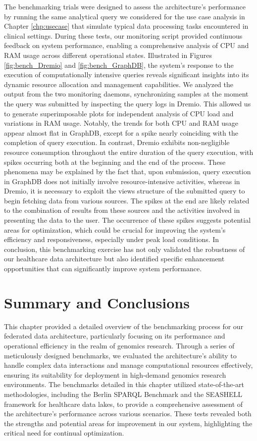The benchmarking trials were designed to assess the architecture's performance by running the same analytical query we considered for the use case analysis in Chapter \ref{chp:usecase} that simulate typical data processing tasks encountered in clinical settings. During these tests, our monitoring script provided continuous feedback on system performance, enabling a comprehensive analysis of \ac{CPU} and \ac{RAM} usage across different operational states.
Illustrated in Figures \ref{fig:bench_Dremio} and \ref{fig:bench_GraphDB}, the system's response to the execution of computationally intensive queries reveals significant insights into its dynamic resource allocation and management capabilities.
We analyzed the output from the two monitoring daemons, synchronizing samples at the moment the query was submitted by inspecting the query logs in Dremio. This allowed us to generate superimposable plots for independent analysis of \ac{CPU} load and variations in \ac{RAM} usage.
Notably, the trends for both \ac{CPU} and \ac{RAM} usage appear almost flat in GraphDB, except for a spike nearly coinciding with the completion of query execution. In contrast, Dremio exhibits non-negligible resource consumption throughout the entire duration of the query execution, with spikes occurring both at the beginning and the end of the process.
These phenomena may be explained by the fact that, upon submission, query execution in GraphDB does not initially involve resource-intensive activities, whereas in Dremio, it is necessary to exploit the views structure of the submitted query to begin fetching data from various sources. The spikes at the end are likely related to the combination of results from these sources and the activities involved in presenting the data to the user.
The occurrence of these spikes suggests potential areas for optimization, which could be crucial for improving the system's efficiency and responsiveness, especially under peak load conditions.
In conclusion, this benchmarking exercise has not only validated the robustness of our healthcare data architecture but also identified specific enhancement opportunities that can significantly improve system performance.


\section{Summary and Conclusions}
This chapter provided a detailed overview of the benchmarking process for our federated data architecture, particularly focusing on its performance and operational efficiency in the realm of genomics research. Through a series of meticulously designed benchmarks, we evaluated the architecture's ability to handle complex data interactions and manage computational resources effectively, ensuring its suitability for deployment in high-demand genomics research environments.
The benchmarks detailed in this chapter utilized state-of-the-art methodologies, including the Berlin \ac{SPARQL} Benchmark and the \ac{SEASHELL} framework for healthcare data lakes, to provide a comprehensive assessment of the architecture's performance across various scenarios. These tests revealed both the strengths and potential areas for improvement in our system, highlighting the critical need for continual optimization.